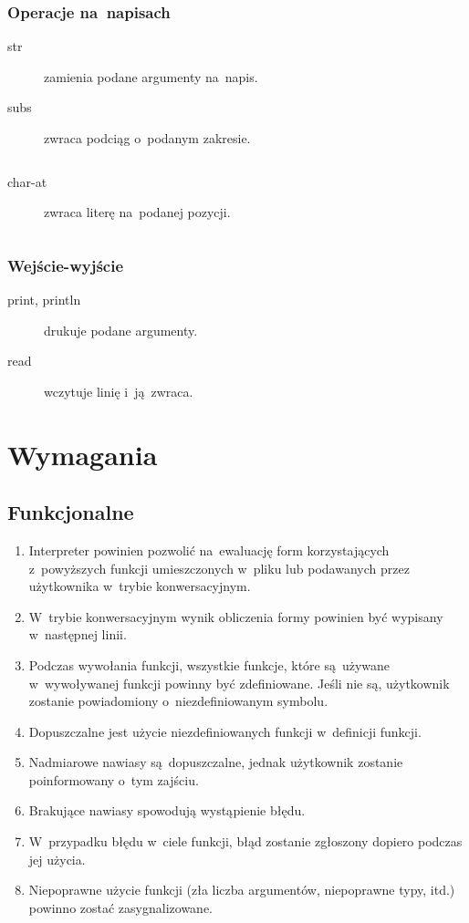 \documentclass[a4paper,11pt]{article}
\newcommand{\clj}[1]{
\inputminted[fontsize=\footnotesize,frame=single,samepage=true]{clojure}{code/#1.clj}
}
\begin{document}
\subsubsection{Operacje na~napisach}

\begin{description}
\item[str] zamienia podane argumenty na~napis.

\item[subs] zwraca podciąg o~podanym zakresie.
  \clj{subs}

\item[char-at] zwraca literę na~podanej pozycji.
  \clj{char-at}
\end{description}

\subsubsection{Wejście-wyjście}

\begin{description}
\item[print, println] drukuje podane argumenty.
\item[read] wczytuje linię i~ją~zwraca.
\end{description}

\section{Wymagania}

\subsection{Funkcjonalne}

\begin{enumerate}
\item Interpreter powinien pozwolić na~ewaluację form korzystających
  z~powyższych funkcji umieszczonych w~pliku lub podawanych przez użytkownika
  w~trybie konwersacyjnym.
\item W~trybie konwersacyjnym wynik obliczenia formy powinien być wypisany
  w~następnej linii.
\item Podczas wywołania funkcji, wszystkie funkcje, które są~używane
  w~wywoływanej funkcji powinny być zdefiniowane. Jeśli nie są, użytkownik
  zostanie powiadomiony o~niezdefiniowanym symbolu.
\item Dopuszczalne jest użycie niezdefiniowanych funkcji w~definicji funkcji.
\item Nadmiarowe nawiasy są~dopuszczalne, jednak użytkownik zostanie
  poinformowany o~tym zajściu.
\item Brakujące nawiasy spowodują wystąpienie błędu.
\item W~przypadku błędu w~ciele funkcji, błąd zostanie zgłoszony dopiero
  podczas jej użycia.
\item Niepoprawne użycie funkcji (zła liczba argumentów, niepoprawne typy,
  itd.) powinno zostać zasygnalizowane.
\end{enumerate}
\end{document}
